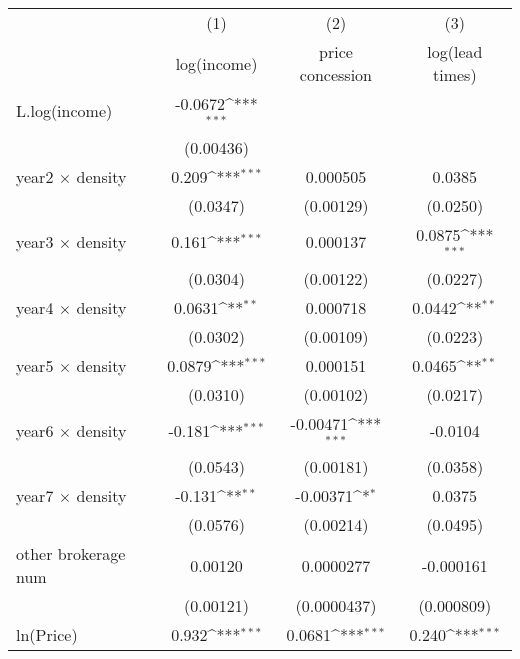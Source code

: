 {
\def\sym#1{\ifmmode^{#1}\else\(^{#1}\)\fi}
\begin{tabular}{l*{3}{c}}
\toprule
            &\multicolumn{1}{c}{(1)}&\multicolumn{1}{c}{(2)}&\multicolumn{1}{c}{(3)}\\
            &\multicolumn{1}{c}{log(income)}&\multicolumn{1}{c}{price concession}&\multicolumn{1}{c}{log(lead times)}\\
\midrule
L.log(income) &     -0.0672\sym{***}&                     &                     \\
            &   (0.00436)         &                     &                     \\
\addlinespace
year2 $\times$ density&       0.209\sym{***}&    0.000505         &      0.0385         \\
            &    (0.0347)         &   (0.00129)         &    (0.0250)         \\
\addlinespace
year3 $\times$ density&       0.161\sym{***}&    0.000137         &      0.0875\sym{***}\\
            &    (0.0304)         &   (0.00122)         &    (0.0227)         \\
\addlinespace
year4 $\times$ density&      0.0631\sym{**} &    0.000718         &      0.0442\sym{**} \\
            &    (0.0302)         &   (0.00109)         &    (0.0223)         \\
\addlinespace
year5 $\times$ density&      0.0879\sym{***}&    0.000151         &      0.0465\sym{**} \\
            &    (0.0310)         &   (0.00102)         &    (0.0217)         \\
\addlinespace
year6 $\times$ density&      -0.181\sym{***}&    -0.00471\sym{***}&     -0.0104         \\
            &    (0.0543)         &   (0.00181)         &    (0.0358)         \\
\addlinespace
year7 $\times$ density&      -0.131\sym{**} &    -0.00371\sym{*}  &      0.0375         \\
            &    (0.0576)         &   (0.00214)         &    (0.0495)         \\
\addlinespace
other brokerage num  &     0.00120         &   0.0000277         &   -0.000161         \\
            &   (0.00121)         & (0.0000437)         &  (0.000809)         \\
\addlinespace
ln(Price)&       0.932\sym{***}&      0.0681\sym{***}&       0.240\sym{***}\\

\end{tabular}}
